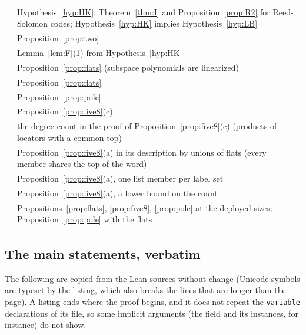 {\begin{longtable}{@{}L{0.34\textwidth}L{0.62\textwidth}@{}}
 & Hypothesis~\ref{hyp:HK}; Theorem~\ref{thm:I} and Proposition~\ref{prop:R2} for Reed-Solomon codes; Hypothesis~\ref{hyp:HK} implies Hypothesis~\ref{hyp:LB}\\
 & Proposition~\ref{prop:two}\\
 & Lemma~\ref{lem:F}(1) from Hypothesis~\ref{hyp:HK}\\
\addlinespace
{} & Proposition~\ref{prop:flats} (subspace polynomials are linearized)\\
 & Proposition~\ref{prop:flats}\\
 & Proposition~\ref{prop:pole}\\
 & Proposition~\ref{prop:five8}(c)\\
 & the degree count in the proof of Proposition~\ref{prop:five8}(c) (products of locators with a common top)\\
 & Proposition~\ref{prop:five8}(a) in its description by unions of flats (every member shares the top of the word)\\
 & Proposition~\ref{prop:five8}(a), one list member per label set\\
 & Proposition~\ref{prop:five8}(a), a lower bound on the count\\
 & Propositions~\ref{prop:flats}, \ref{prop:five8}, \ref{prop:pole} at the deployed sizes; Proposition~\ref{prop:pole} with the flats\\
\bottomrule
\end{longtable}}

\subsection*{The main statements, verbatim}

The following are copied from the Lean sources without change (Unicode symbols are typeset by the listing, which also breaks the lines that are longer than the page). A listing ends where the proof begins, and it does not repeat the \texttt{variable} declarations of its file, so some implicit arguments (the field and its instances, for instance) do not show.


